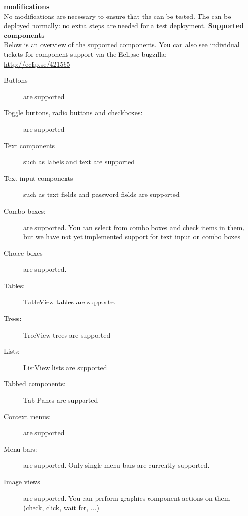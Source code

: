 \textbf{\gdaut{} modifications}\\
No modifications are necessary to ensure that the \gdaut{} can be tested. The \gdaut{} can be deployed normally: no extra steps are needed for a test deployment.
\textbf{Supported components}\\
Below is an overview of the supported components. You can also see individual tickets for component support via the Eclipse bugzilla:\\
\url{http://eclip.se/421595}
\begin{description}
\item [Buttons]{are supported}
\item [Toggle buttons, radio buttons and checkboxes:]{are supported}
\item [Text components]{such as labels and text are supported}
\item [Text input components]{such as text fields and password fields are supported}
\item [Combo boxes:]{are supported. You can select from combo boxes and check items in them, but we have not yet implemented support for text input on combo boxes}
\item [Choice boxes]{are supported.}
\item [Tables:]{TableView tables are supported}
\item [Trees:]{TreeView trees are supported}
\item [Lists:]{ListView lists are supported}
\item [Tabbed components:]{Tab Panes are supported}
\item [Context menus:]{are supported}
\item [Menu bars:]{are supported. Only single menu bars are currently supported.}
\item [Image views]{are supported. You can perform graphics component actions on them (check, click, wait for, ...)}
\end{description}
